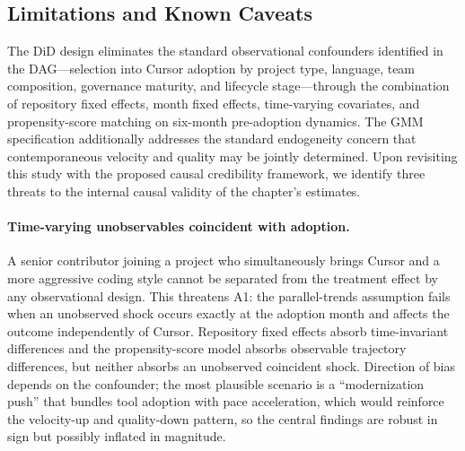 \subsection{Limitations and Known Caveats}
\label{sec:cursor-credibility-limitations}

The DiD design eliminates the standard observational confounders identified in the DAG---selection into Cursor adoption by project type, language, team composition, governance maturity, and lifecycle stage---through the combination of repository fixed effects, month fixed effects, time-varying covariates, and propensity-score matching on six-month pre-adoption dynamics.
The GMM specification additionally addresses the standard endogeneity concern that contemporaneous velocity and quality may be jointly determined.
Upon revisiting this study with the proposed causal credibility framework, we identify three threats to the internal causal validity of the chapter's estimates.

\paragraph{Time-varying unobservables coincident with adoption.}
A senior contributor joining a project who simultaneously brings Cursor and a more aggressive coding style cannot be separated from the treatment effect by any observational design.
This threatens A1: the parallel-trends assumption fails when an unobserved shock occurs exactly at the adoption month and affects the outcome independently of Cursor.
Repository fixed effects absorb time-invariant differences and the propensity-score model absorbs observable trajectory differences, but neither absorbs an unobserved coincident shock.
Direction of bias depends on the confounder; the most plausible scenario is a ``modernization push'' that bundles tool adoption with pace acceleration, which would reinforce the velocity-up and quality-down pattern, so the central findings are robust in sign but possibly inflated in magnitude.

